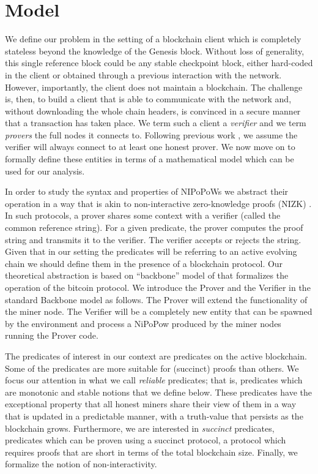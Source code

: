 \section{Model}

We define our problem in the setting of a blockchain client which is completely
stateless beyond the knowledge of the Genesis block. Without loss of
generality, this single reference block could be any stable checkpoint block,
either hard-coded in the client or obtained through a previous interaction with
the network. However, importantly, the client does not maintain a blockchain.
The challenge is, then, to build a client that is able to communicate with the
network and, without downloading the whole chain headers, is convinced in a
secure manner that a transaction has taken place. We term such a client a
\textit{verifier} and we term \textit{provers} the full nodes it connects to.
Following previous work \cite{backbone} \cite{KLS}, we assume the verifier will
always connect to at least one honest prover. We now move on to formally define
these entities in terms of a mathematical model which can be used for our
analysis.

In order to study the syntax and properties of NIPoPoWs
we abstract their operation in a way that is akin to non-interactive
zero-knowledge proofs (NIZK) \cite{BFM88}. In such protocols, a prover
shares some context with a verifier (called the common reference string).
For a given predicate, the prover computes the proof string and transmits it
to the verifier. The verifier accepts or rejects the string. Given that in our
setting the predicates will be referring to an active evolving chain 
we should define them in the presence of a blockchain protocol. 
Our theoretical abstraction is based on ``backbone'' model of
\cite{backbone} that formalizes the operation of the bitcoin protocol.
We introduce the Prover and the Verifier in
the standard Backbone model as follows. The Prover will extend the functionality
of the miner node. The Verifier will be a completely new entity that can be spawned
by the environment and process a NiPoPow produced by the miner nodes running
the Prover code. 

The predicates of interest in our context are predicates on the active blockchain. 
Some of the predicates are more suitable for (succinct) proofs than others. We focus
our attention in what we call \textit{reliable} predicates; that is,
predicates which are monotonic and stable notions that we define below.  
These predicates have the
exceptional property that all honest miners share their view of them in a way
that is updated in a predictable manner, with a truth-value that persists as the
blockchain grows.  Furthermore, we are interested in \textit{succinct}
predicates, predicates which can be proven using a succinct protocol, a
protocol which requires proofs that are short in terms of the total blockchain
size. Finally, we formalize the notion of non-interactivity.

